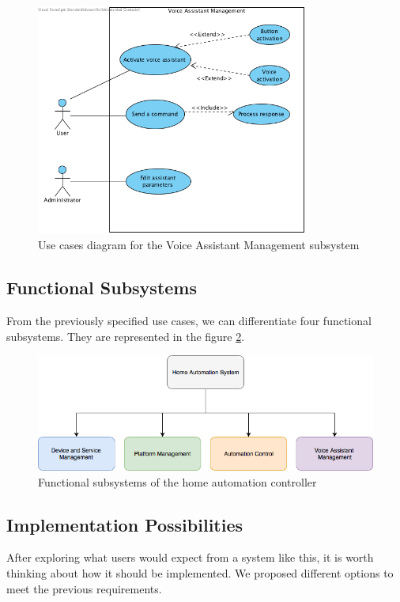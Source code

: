 \begin{figure}
	\centering
	\includegraphics[width=0.8\textwidth]{images/Chapter_06/UC-voice-assistant-management.png}
	\caption{Use cases diagram for the Voice Assistant Management subsystem}
	\label{fig:UC-voice-assistant-management}
\end{figure}

\subsection{Functional Subsystems}
From the previously specified use cases, we can differentiate four functional subsystems. They are represented in the figure
\ref{fig:functional-subsystems}.

\begin{figure}
	\centering
	\includegraphics[width=1\textwidth]{images/Chapter_06/functional-subsystems.png}
	\caption{Functional subsystems of the home automation controller}
	\label{fig:functional-subsystems}
\end{figure}

\subsection{Implementation Possibilities}
After exploring what users would expect from a system like this, it is worth thinking about how it should be implemented. We proposed
different options to meet the previous requirements.

